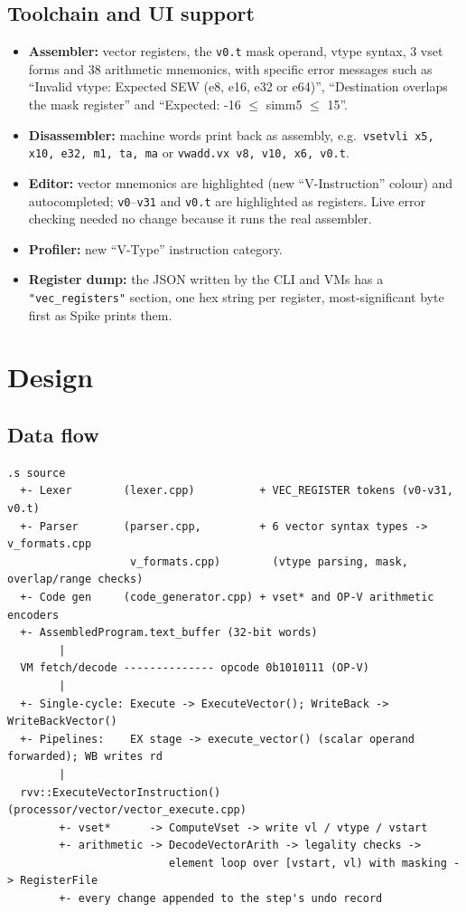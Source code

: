 \documentclass{article}
\begin{document}
\subsection{Toolchain and UI support}
\begin{itemize}
    \item \textbf{Assembler:} vector registers, the \texttt{v0.t} mask operand, vtype syntax,
    3 vset forms and 38 arithmetic mnemonics, with specific error messages such as
    ``Invalid vtype: Expected SEW (e8, e16, e32 or e64)'', ``Destination overlaps the mask
    register'' and ``Expected: -16 $\le$ simm5 $\le$ 15''.
    \item \textbf{Disassembler:} machine words print back as assembly, e.g.\
    \texttt{vsetvli x5, x10, e32, m1, ta, ma} or \texttt{vwadd.vx v8, v10, x6, v0.t}.
    \item \textbf{Editor:} vector mnemonics are highlighted (new ``V-Instruction'' colour) and
    autocompleted; \texttt{v0}--\texttt{v31} and \texttt{v0.t} are highlighted as registers.
    Live error checking needed no change because it runs the real assembler.
    \item \textbf{Profiler:} new ``V-Type'' instruction category.
    \item \textbf{Register dump:} the JSON written by the CLI and VMs has a
    \texttt{"vec\_registers"} section, one hex string per register, most-significant byte first
    as Spike prints them.
\end{itemize}

\section*{Design}
\subsection{Data flow}
\begin{lstlisting}
.s source
  +- Lexer        (lexer.cpp)          + VEC_REGISTER tokens (v0-v31, v0.t)
  +- Parser       (parser.cpp,         + 6 vector syntax types -> v_formats.cpp
                   v_formats.cpp)        (vtype parsing, mask, overlap/range checks)
  +- Code gen     (code_generator.cpp) + vset* and OP-V arithmetic encoders
  +- AssembledProgram.text_buffer (32-bit words)
        |
  VM fetch/decode -------------- opcode 0b1010111 (OP-V)
        |
  +- Single-cycle: Execute -> ExecuteVector(); WriteBack -> WriteBackVector()
  +- Pipelines:    EX stage -> execute_vector() (scalar operand forwarded); WB writes rd
        |
  rvv::ExecuteVectorInstruction()   (processor/vector/vector_execute.cpp)
        +- vset*      -> ComputeVset -> write vl / vtype / vstart
        +- arithmetic -> DecodeVectorArith -> legality checks ->
                         element loop over [vstart, vl) with masking -> RegisterFile
        +- every change appended to the step's undo record
\end{lstlisting}
\end{document}
